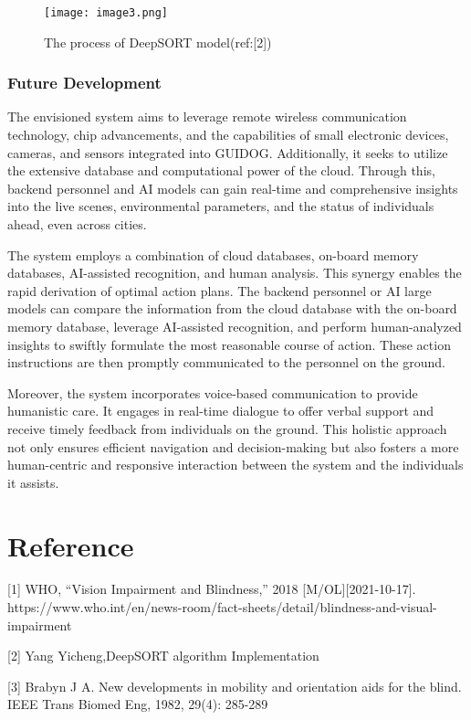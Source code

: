 \documentclass{article}
\begin{document}
\begin{figure}[h]
    \centering
    \texttt{[image: image3.png]}
    \caption{The process of DeepSORT model(ref:[2])}
    \label{fig:The process of DeepSORT model(ref:[2])}
\end{figure}

\subsubsection{Future Development}
The envisioned system aims to leverage remote wireless communication technology, chip advancements, and the capabilities of small electronic devices, cameras, and sensors integrated into GUIDOG. Additionally, it seeks to utilize the extensive database and computational power of the cloud. Through this, backend personnel and AI models can gain real-time and comprehensive insights into the live scenes, environmental parameters, and the status of individuals ahead, even across cities.

The system employs a combination of cloud databases, on-board memory databases, AI-assisted recognition, and human analysis. This synergy enables the rapid derivation of optimal action plans. The backend personnel or AI large models can compare the information from the cloud database with the on-board memory database, leverage AI-assisted recognition, and perform human-analyzed insights to swiftly formulate the most reasonable course of action. These action instructions are then promptly communicated to the personnel on the ground.

Moreover, the system incorporates voice-based communication to provide humanistic care. It engages in real-time dialogue to offer verbal support and receive timely feedback from individuals on the ground. This holistic approach not only ensures efficient navigation and decision-making but also fosters a more human-centric and responsive interaction between the system and the individuals it assists.

\section{Reference}
[1] WHO, “Vision Impairment and Blindness,” 2018 [M/OL][2021-10-17]. https://www.who.int/en/news-room/fact-sheets/detail/blindness-and-visual-impairment

[2] Yang Yicheng,DeepSORT algorithm Implementation

[3] Brabyn J A. New developments in mobility and orientation aids for the blind. IEEE Trans Biomed Eng, 1982, 29(4): 285-289
\end{document}
